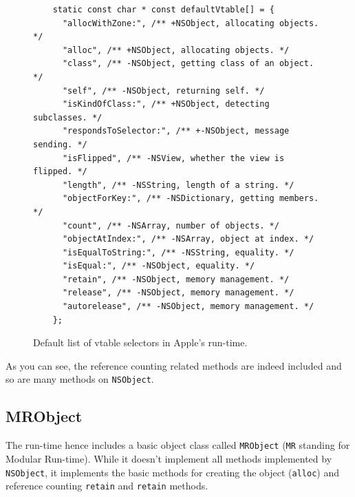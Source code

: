 \begin{figure}[H]
  \begin{verbatim}
    static const char * const defaultVtable[] = {
      "allocWithZone:", /** +NSObject, allocating objects. */
      "alloc", /** +NSObject, allocating objects. */
      "class", /** -NSObject, getting class of an object. */
      "self", /** -NSObject, returning self. */
      "isKindOfClass:", /** +NSObject, detecting subclasses. */
      "respondsToSelector:", /** +-NSObject, message sending. */
      "isFlipped", /** -NSView, whether the view is flipped. */
      "length", /** -NSString, length of a string. */
      "objectForKey:", /** -NSDictionary, getting members. */
      "count", /** -NSArray, number of objects. */
      "objectAtIndex:", /** -NSArray, object at index. */
      "isEqualToString:", /** -NSString, equality. */
      "isEqual:", /** -NSObject, equality. */
      "retain", /** -NSObject, memory management. */
      "release", /** -NSObject, memory management. */ 
      "autorelease", /** -NSObject, memory management. */
    };
  \end{verbatim}
  \centering{}
  \caption{Default list of vtable selectors in Apple's run-time.}
  \label{fig:vtable_def_sels}
\end{figure}

As you can see, the reference counting related methods are indeed included and so are many methods on \verb=NSObject=.

\subsection{MRObject}

The run-time hence includes a basic object class called \verb=MRObject= (\verb=MR= standing for Modular Run-time). While it doesn't implement all methods implemented by \verb=NSObject=, it implements the basic methods for creating the object (\verb=alloc=) and reference counting \verb=retain= and \verb=retain= methods.

